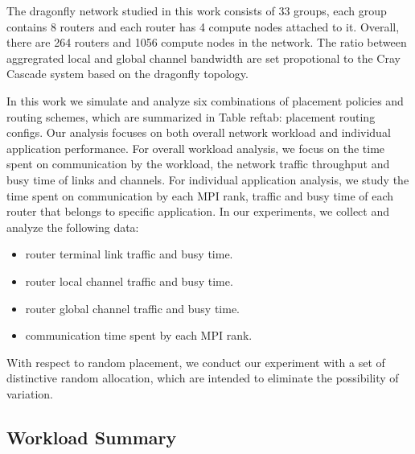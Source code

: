\documentclass[conference,compsoc]{IEEEtran}
\begin{document}
The dragonfly network studied in this work consists of 33 groups, each group contains 8 routers and each router has 4 compute nodes attached to it. Overall, there are 264 routers and 1056 compute nodes in the network. The ratio between aggregrated local and global channel bandwidth are set propotional to the Cray Cascade system\cite{faanes} based on the dragonfly topology\cite{dally-dragonfly}.

In this work we simulate and analyze six combinations of placement policies and routing schemes, which are summarized in Table ref{tab: placement routing configs}. Our analysis focuses on both overall network workload and individual application performance. For overall workload analysis, we focus on the time spent on communication by the workload, the network traffic throughput and busy time of links and channels. For individual application analysis, we study the time spent on communication by each MPI rank, traffic and busy time of each router that belongs to specific application. In our experiments, we collect and analyze the following data: 

\begin{itemize}
    \item router terminal link traffic and busy time.
    \item router local channel traffic and busy time.
    \item router global channel traffic and busy time.
    \item communication time spent by each MPI rank. 
\end{itemize}

With respect to random placement, we conduct our experiment with a set of distinctive random allocation, which are intended to eliminate the possibility of variation.

%
\subsection{Workload Summary}
\label{sec:workload summary}
\end{document}
